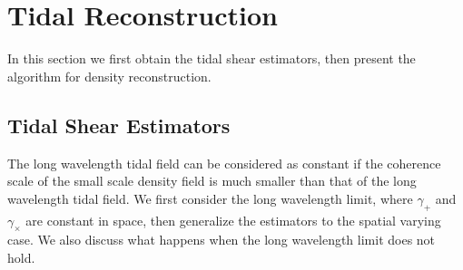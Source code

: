 \documentclass[aps,prd,twocolumn,showpacs,superscriptaddress,groupedaddress,nofootinbib]{revtex4}  %
\begin{document}
\section{Tidal Reconstruction}
In this section we first obtain the tidal shear estimators,  then 
present the algorithm for density reconstruction.

\subsection{Tidal Shear Estimators}
The long wavelength tidal field can be considered as constant if the coherence scale 
of the small scale density field is much smaller 
than that of the long wavelength tidal field.
We first consider the long wavelength limit, where $\gamma_+$ and 
$\gamma_\times$ are constant in space, then generalize the estimators to the 
spatial varying case. We also discuss what happens when the long wavelength 
limit does not hold.
\end{document}
